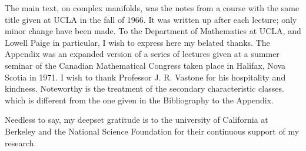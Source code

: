 %
%

\preface

The main text, on complex manifolds, was the notes from a course with the same title given at UCLA in the fall of 1966. It was written up after each lecture; only minor change have been made. To the Department of Mathematics at UCLA, and Lowell Paige in particular, I wish to express here my belated thanks. The Appendix was an expanded version of a series of lectures given at a summer seminar of the Canadian Mathematical Congress taken place in Halifax, Nova Scotia in 1971. I wish to thank Professor J. R. Vastone for his hospitality and kindness. Noteworthy is the treatment of the secondary characteristic classes. which is different from the one given in the Bibliography to the Appendix.\par
Needless to say, my deepset gratitude is to the university of California at Berkeley and the National Science Foundation for their continuous support of my research.
 



